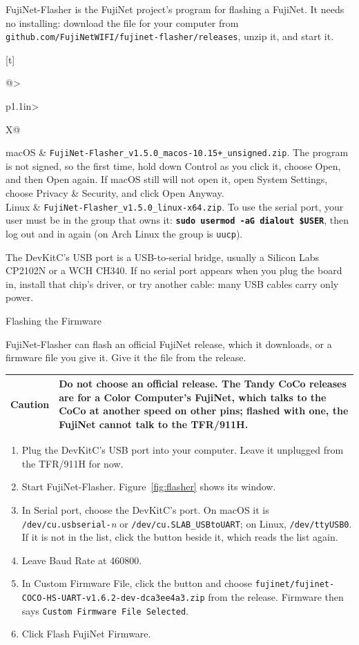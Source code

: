 \documentclass[10pt,twoside,openany]{book}
\makeatletter
\newcommand{\var}[1]{\textit{#1}}            %
\newcommand{\file}[1]{\texttt{#1}}           %
\newcommand{\key}[1]{\textsf{\small #1}}     %
\newcommand{\type}[1]{\texttt{\textbf{#1}}}  %
\newcommand{\sans}[1]{\textsf{#1}}
\newcommand{\lfile}[1]{\nolinkurl{#1}}      %
\newenvironment{steps}{\begin{enumerate}\setlength{\itemsep}{0.6ex}%
  \renewcommand{\labelenumi}{\sffamily\bfseries\arabic{enumi}.}}{\end{enumerate}}
\newcommand{\notice}[2]{\par\vspace{0.8ex}\noindent
  \begin{tabularx}{\linewidth}{@{}>{\sffamily\bfseries}p{0.85in}X@{}}
  \toprule #1 & #2\\ \bottomrule\end{tabularx}\par\vspace{0.6ex}}
\newcommand{\caution}[1]{\notice{Caution}{#1}}
\renewcommand{\section}{\@startsection{section}{1}{0pt}{3.2ex plus 1ex}{1.2ex}%
  {\sffamily\bfseries\large}}
\newenvironment{keys}[1][1.1in]{\par\tabularx{\linewidth}[t]{@{}>{\raggedright\arraybackslash}p{#1}>{\raggedright\arraybackslash}X@{}}}%
  {\endtabularx\par}
\makeatother
\begin{document}
FujiNet-Flasher is the FujiNet project's program for flashing a FujiNet.
It needs no installing: download the file for your computer from
\file{github.com/FujiNetWIFI/fujinet-flasher/releases}, unzip it, and
start it.

\begin{keys}[1.1in]
macOS & \file{FujiNet-Flasher\_v1.5.0\_macos-10.15+\_unsigned.zip}. The
program is not signed, so the first time, hold down \key{Control} as you
click it, choose \key{Open}, and then \key{Open} again. If macOS still
will not open it, open System Settings, choose \key{Privacy \& Security},
and click \key{Open Anyway}.\\
Linux & \file{FujiNet-Flasher\_v1.5.0\_linux-x64.zip}. To use the serial
port, your user must be in the group that owns it: \type{sudo usermod
-aG dialout \$USER}, then log out and in again (on Arch Linux the group
is \texttt{uucp}).\\
\end{keys}

The DevKitC's USB port is a USB-to-serial bridge, usually a Silicon Labs
CP2102N or a WCH CH340. If no serial port appears when you plug the board
in, install that chip's driver, or try another cable: many USB cables
carry only power.

\section{Flashing the Firmware}

FujiNet-Flasher can flash an official FujiNet release, which it downloads,
or a firmware file you give it. Give it the file from the release.

\caution{Do not choose an official release. The Tandy CoCo releases are
for a Color Computer's FujiNet, which talks to the CoCo at another speed
on other pins; flashed with one, the FujiNet cannot talk to the
TFR/911H.}

\begin{steps}
\item Plug the DevKitC's USB port into your computer. Leave it unplugged
from the TFR/911H for now.
\item Start FujiNet-Flasher. Figure~\ref{fig:flasher} shows its window.
\item In \sans{Serial port}, choose the DevKitC's port. On macOS it is
\file{/dev/cu.usbserial-}\var{n} or \lfile{/dev/cu.SLAB_USBtoUART}; on
Linux, \file{/dev/ttyUSB0}. If it is not in the list, click the button
beside it, which reads the list again.
\item Leave \sans{Baud Rate} at 460800.
\item In \sans{Custom Firmware File}, click the button and choose
\lfile{fujinet/fujinet-COCO-HS-UART-v1.6.2-dev-dca3ee4a3.zip} from the
release. \sans{Firmware} then says \texttt{Custom Firmware File
Selected}.
\item Click \key{Flash FujiNet Firmware}.
\end{steps}
\end{document}
